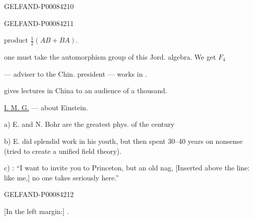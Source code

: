 \begin{GelfandAdjacentEvidence}{GELFAND-P000842}{10}

\end{GelfandAdjacentEvidence}
\begin{GelfandAdjacentEvidence}{GELFAND-P000842}{11}


product \(\frac12(AB+BA)\).

one must take the automorphism group of this Jord. algebra. We get \(F_4\)

 — adviser to the Chin. president — works in .

 gives lectures in China to an audience of a thousand.

\uline{I. M. G.} —  about Einstein.

a) E. and N. Bohr are the greatest phys. of the century

b) E. did splendid work in his youth, but then spent 30–40 years on nonsense (tried to create a unified field theory).

c) : “I want to invite you to Princeton, but an old nag, [Inserted above the line: like me,] no one takes seriously here.”
\end{GelfandAdjacentEvidence}
\begin{GelfandAdjacentEvidence}{GELFAND-P000842}{12}


[In the left margin:] .
\end{GelfandAdjacentEvidence}
